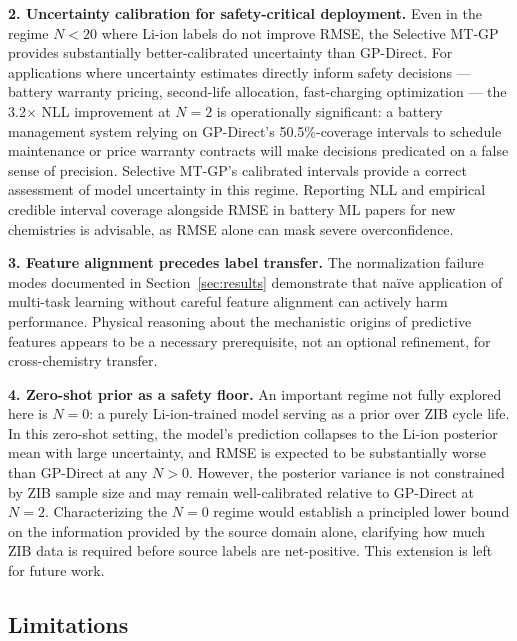 \documentclass[12pt]{article}
\begin{document}
\textbf{2. Uncertainty calibration for safety-critical deployment.} Even in
the regime $N < 20$ where Li-ion labels do not improve RMSE, the Selective
MT-GP provides substantially better-calibrated uncertainty than GP-Direct. For
applications where uncertainty estimates directly inform safety decisions ---
battery warranty pricing, second-life allocation, fast-charging optimization ---
the 3.2$\times$ NLL improvement at $N = 2$ is operationally significant: a
battery management system relying on GP-Direct's 50.5\%-coverage intervals
to schedule maintenance or price warranty contracts will make decisions
predicated on a false sense of precision. Selective MT-GP's calibrated intervals
provide a correct assessment of model uncertainty in this regime.
Reporting NLL and
empirical credible interval coverage alongside RMSE in battery ML papers for
new chemistries is advisable, as RMSE alone can mask severe overconfidence.

\textbf{3. Feature alignment precedes label transfer.} The normalization failure
modes documented in Section~\ref{sec:results} demonstrate that na\"ive
application of multi-task learning without careful feature alignment can
actively harm performance. Physical reasoning about the mechanistic origins of
predictive features appears to be a necessary prerequisite, not an optional
refinement, for cross-chemistry transfer.

\textbf{4. Zero-shot prior as a safety floor.} An important regime not fully
explored here is $N = 0$: a purely Li-ion-trained model serving as a prior over
ZIB cycle life. In this zero-shot setting, the model's prediction collapses to
the Li-ion posterior mean with large uncertainty, and RMSE is expected to be
substantially worse than GP-Direct at any $N > 0$. However, the posterior
variance is not constrained by ZIB sample size and may remain well-calibrated
relative to GP-Direct at $N = 2$. Characterizing the $N = 0$ regime would
establish a principled lower bound on the information provided by the source
domain alone, clarifying how much ZIB data is required before source labels
are net-positive. This extension is left for future work.

\subsection{Limitations}
\end{document}
